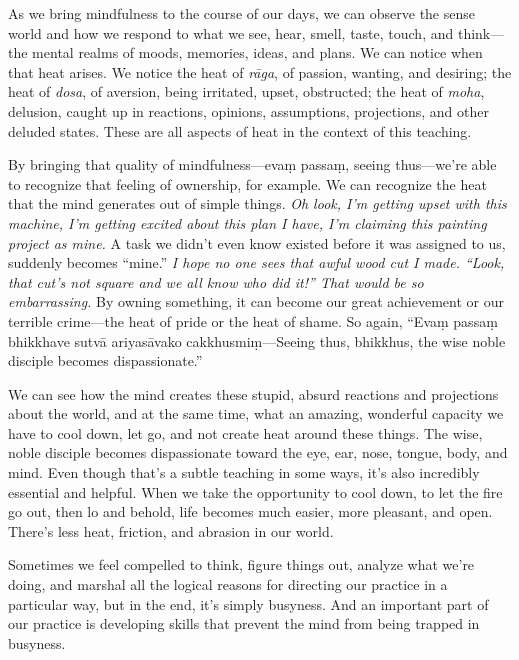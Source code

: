 As we bring mindfulness to the course of our days, we can observe the 
sense world and how we respond to what we see, hear, smell, taste, 
touch, and think---the mental realms of moods, memories, ideas, and 
plans. We can notice when that heat arises. We notice the heat of 
\emph{rāga}, of passion, wanting, and desiring; the heat of 
\emph{dosa}, of aversion, being irritated, upset, obstructed; the heat 
of \emph{moha}, delusion, caught up in reactions, opinions, 
assumptions, projections, and other deluded states. These are all 
aspects of heat in the context of this teaching.

By bringing that quality of mindfulness---evaṃ passaṃ, seeing 
thus---we're able to recognize that feeling of ownership, for example. 
We can recognize the heat that the mind generates out of simple things. 
\emph{Oh look, I'm getting upset with this machine, I'm getting excited 
about this plan I have, I'm claiming this painting project as mine.} A 
task we didn't even know existed before it was assigned to us, suddenly 
becomes ``mine.'' \emph{I hope no one sees that awful wood cut I made. 
``Look, that cut's not square and we all know who did it!'' That would 
be so embarrassing.} By owning something, it can become our great 
achievement or our terrible crime---the heat of pride or the heat of 
shame. So again, ``Evaṃ passaṃ bhikkhave sutvā ariyasāvako 
cakkhusmiṃ---Seeing thus, bhikkhus, the wise noble disciple becomes 
dispassionate.''

We can see how the mind creates these stupid, absurd reactions and 
projections about the world, and at the same time, what an amazing, 
wonderful capacity we have to cool down, let go, and not create heat 
around these things. The wise, noble disciple becomes dispassionate 
toward the eye, ear, nose, tongue, body, and mind. Even though that's a 
subtle teaching in some ways, it's also incredibly essential and 
helpful. When we take the opportunity to cool down, to let the fire go 
out, then lo and behold, life becomes much easier, more pleasant, and 
open. There's less heat, friction, and abrasion in our world.


Sometimes we feel compelled to think, figure things out, analyze what 
we're doing, and marshal all the logical reasons for directing our 
practice in a particular way, but in the end, it's simply busyness. And 
an important part of our practice is developing skills that prevent the 
mind from being trapped in busyness.

